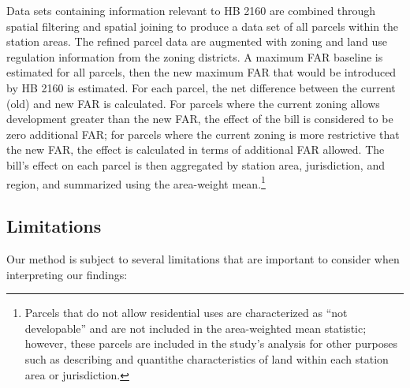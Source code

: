 \documentclass[
]{agujournal2019}
\begin{document}
Data sets containing information relevant to HB 2160 are combined
through spatial filtering and spatial joining to produce a data set of
all parcels within the station areas. The refined parcel data are
augmented with zoning and land use regulation information from the
zoning districts. A maximum FAR baseline is estimated for all parcels,
then the new maximum FAR that would be introduced by HB 2160 is
estimated. For each parcel, the net difference between the current (old)
and new FAR is calculated. For parcels where the current zoning allows
development greater than the new FAR, the effect of the bill is
considered to be zero additional FAR; for parcels where the current
zoning is more restrictive that the new FAR, the effect is calculated in
terms of additional FAR allowed. The bill's effect on each parcel is
then aggregated by station area, jurisdiction, and region, and
summarized using the area-weight mean.\footnote{Parcels that do not
  allow residential uses are characterized as ``not developable'' and
  are not included in the area-weighted mean statistic; however, these
  parcels are included in the study's analysis for other purposes such
  as describing and quantithe characteristics of land within each
  station area or jurisdiction.}

\subsection{Limitations}\label{limitations}

Our method is subject to several limitations that are important to
consider when interpreting our findings:
\end{document}
